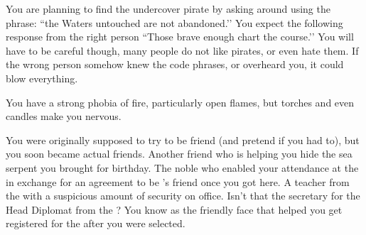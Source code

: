 \documentclass[char]{GL2020}
\begin{document}
\begin{itemz}[Notes]
	\item You are planning to find the undercover pirate by asking around using the phrase: ``the Waters untouched are not abandoned.’’ You expect the following response from the right person ``Those brave enough chart the course.’’ You will have to be careful though, many people do not like pirates, or even hate them. If the wrong person somehow knew the code phrases, or overheard you, it could blow everything.
	\item You have a strong phobia of fire, particularly open flames, but torches and even candles make you nervous.
\end{itemz}

\begin{contacts}
	\contact{\cDisney{}} You were originally supposed to try to be \cDisney{\their} friend (and pretend if you had to), but you soon became actual friends.
	\contact{\cAdopted{}} Another friend who is helping you hide the sea serpent you brought \cDisney{} for \cDisney{\their} birthday.
	\contact{\cWildCard{}} The \pFarm{} noble \cWildCard{\person} who enabled your attendance at the \pSchool{} in exchange for an agreement to be \cDisney{}’s friend once you got here.
	\contact{\cChupInventor{}} A teacher from the \pTech{} with a suspicious amount of security on \cChupInventor{\their} office.
\contact{\cChupLeader{}} Isn’t that the secretary for the Head Diplomat from the \pShip{}? You know \cChupLeader{} as the friendly face that helped you get registered for the \pSchool{} after you were selected.
\end{contacts}
\end{document}
